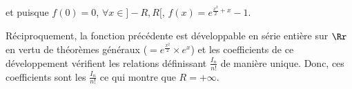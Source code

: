{{et puisque $f(0)=0$, $\forall x\in]-R,R[$, $f(x)=e^{\frac{x^2}{2}+x}-1$.

Réciproquement, la fonction précédente est développable en série entière sur $\Rr$ en vertu de théorèmes généraux ($=e^{\frac{x^2}{2}}\times e^x$) et les coefficients de ce développement vérifient les relations définissant $\frac{I_n}{n!}$ de manière unique. Donc, ces coefficients sont les $\frac{I_n}{n!}$ ce qui montre que $R = +\infty$.

\begin{center}
\end{center}}
}
